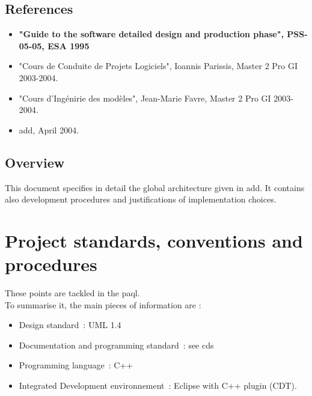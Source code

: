 \subsection{References}
\label{Sec:DDD-References}

\begin{itemize}

\item \textbf{"Guide to the software detailed design and production phase", PSS-05-05, ESA 1995}
\item "Cours de Conduite de Projets Logiciels", Ioannis Parissis, Master 2 Pro GI 2003-2004.
\item "Cours d'Ing\'enirie des mod\`eles", Jean-Marie Favre, Master 2 Pro GI 2003-2004.
\item \ac{add}, April 2004.

\end{itemize}



\subsection{Overview}
\label{Sec:DDD-Overview}

This document specifies in detail the global architecture given in \ac{add}. It contains also development procedures and justifications of implementation choices.


\section{Project standards, conventions and procedures}
\label{Sec:DDD-ProjectStandards}
%

These points are tackled in the \ac{paql}.\\

To summarise it, the main pieces of information are :

\begin{itemize}

\item Design standard~: UML 1.4
\item Documentation and programming standard~: see \ac{cds}
\item Programming language~: C++
\item Integrated Development environnement~: Eclipse with C++ plugin (CDT).

\end{itemize}
